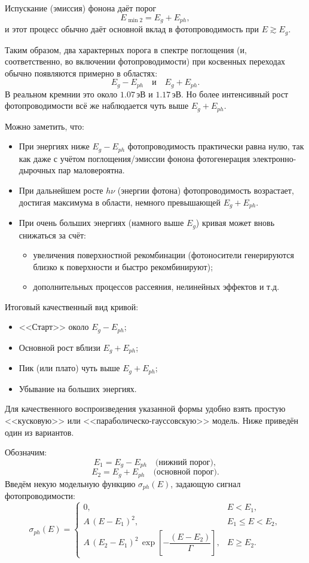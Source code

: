 \documentclass[a4paper, 12pt]{article}
\begin{document}
\begin{enumerate}
Испускание (эмиссия) фонона даёт порог
\[
E_{\min 2} = E_g + E_{ph},
\]
и этот процесс обычно даёт основной вклад в фотопроводимость при \(E \gtrsim E_g\).

Таким образом, два характерных порога в спектре поглощения (и, соответственно, во включении фотопроводимости) при косвенных переходах обычно появляются примерно в областях:
\[
E_g - E_{ph} \quad \text{и} \quad E_g + E_{ph}.
\]
В реальном кремнии это около \(1.07\,\text{эВ}\) и \(1.17\,\text{эВ}\). Но более интенсивный рост фотопроводимости всё же наблюдается чуть выше \(E_g + E_{ph}\).


Можно заметить, что:
\begin{itemize}
    \item При энергиях ниже \(E_g - E_{ph}\) фотопроводимость практически равна нулю, так как даже с учётом поглощения/эмиссии фонона фотогенерация электронно-дырочных пар маловероятна.
    \item При дальнейшем росте \(h\nu\) (энергии фотона) фотопроводимость возрастает, достигая максимума в области, немного превышающей \(E_g + E_{ph}\).
    \item При очень больших энергиях (намного выше \(E_g\)) кривая может вновь снижаться за счёт:
    \begin{itemize}
        \item увеличения поверхностной рекомбинации (фотоносители генерируются близко к поверхности и быстро рекомбинируют);
        \item дополнительных процессов рассеяния, нелинейных эффектов и т.д.
    \end{itemize}
\end{itemize}

Итоговый качественный вид кривой:
\begin{itemize}
    \item <<Старт>> около \(E_g - E_{ph}\);
    \item Основной рост вблизи \(E_g + E_{ph}\);
    \item Пик (или плато) чуть выше \(E_g + E_{ph}\);
    \item Убывание на больших энергиях.
\end{itemize}

Для качественного воспроизведения указанной формы удобно взять простую <<кусковую>> или <<параболическо-гауссовскую>> модель. Ниже приведён один из вариантов.

Обозначим:
\[
E_1 = E_g - E_{ph} \quad \text{(нижний порог)},
\]
\[
E_2 = E_g + E_{ph} \quad \text{(основной порог)}.
\]
Введём некую модельную функцию \(\sigma_{ph}(E)\), задающую сигнал фотопроводимости:
\[
\sigma_{ph}(E) =
\begin{cases}
0, & E < E_1, \\[1ex]
A\,(E - E_1)^2, & E_1 \le E < E_2, \\[1ex]
A\,(E_2 - E_1)^2\,\exp\left[-\dfrac{(E - E_2)}{\Gamma}\right], & E \ge E_2.
\end{cases}
\]


\end{enumerate}
\end{document}
